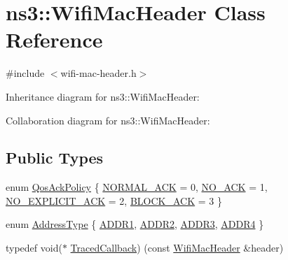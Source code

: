 \hypertarget{classns3_1_1WifiMacHeader}{}\section{ns3\+:\+:Wifi\+Mac\+Header Class Reference}
\label{classns3_1_1WifiMacHeader}


{\ttfamily \#include $<$wifi-\/mac-\/header.\+h$>$}



Inheritance diagram for ns3\+:\+:Wifi\+Mac\+Header\+:


Collaboration diagram for ns3\+:\+:Wifi\+Mac\+Header\+:
\subsection*{Public Types}
\begin{DoxyCompactItemize}
\item 
enum \hyperlink{classns3_1_1WifiMacHeader_ae3a382482f357972019f5e1b3162adc4}{Qos\+Ack\+Policy} \{ \hyperlink{classns3_1_1WifiMacHeader_ae3a382482f357972019f5e1b3162adc4a9f52b9c6ca65d046ce2be9d70bce28cf}{N\+O\+R\+M\+A\+L\+\_\+\+A\+CK} = 0, 
\hyperlink{classns3_1_1WifiMacHeader_ae3a382482f357972019f5e1b3162adc4a5a43789ef4b4eba7b7b1ffab09505d65}{N\+O\+\_\+\+A\+CK} = 1, 
\hyperlink{classns3_1_1WifiMacHeader_ae3a382482f357972019f5e1b3162adc4a89e79ad48fd7f790dcd61d3cf0fd3a44}{N\+O\+\_\+\+E\+X\+P\+L\+I\+C\+I\+T\+\_\+\+A\+CK} = 2, 
\hyperlink{classns3_1_1WifiMacHeader_ae3a382482f357972019f5e1b3162adc4a8d2763ea0083f1265fbf7dda6fdcf9fd}{B\+L\+O\+C\+K\+\_\+\+A\+CK} = 3
 \}
\item 
enum \hyperlink{classns3_1_1WifiMacHeader_a17406db48973a8e8fb6d961dd35154fe}{Address\+Type} \{ \hyperlink{classns3_1_1WifiMacHeader_a17406db48973a8e8fb6d961dd35154fea8ff9765c77ab96f3bbc7385ece3d00bf}{A\+D\+D\+R1}, 
\hyperlink{classns3_1_1WifiMacHeader_a17406db48973a8e8fb6d961dd35154fea8584c6c930d2eafa4ba6131b45efa3d6}{A\+D\+D\+R2}, 
\hyperlink{classns3_1_1WifiMacHeader_a17406db48973a8e8fb6d961dd35154feaa621acb2270764fceef5cf6de7078212}{A\+D\+D\+R3}, 
\hyperlink{classns3_1_1WifiMacHeader_a17406db48973a8e8fb6d961dd35154feab25962f84745a45c4841d8cee3370312}{A\+D\+D\+R4}
 \}
\item 
typedef void($\ast$ \hyperlink{classns3_1_1WifiMacHeader_a62123d116be8a1ba54d2fdeeeb873570}{Traced\+Callback}) (const \hyperlink{classns3_1_1WifiMacHeader}{Wifi\+Mac\+Header} \&header)
\end{DoxyCompactItemize}
